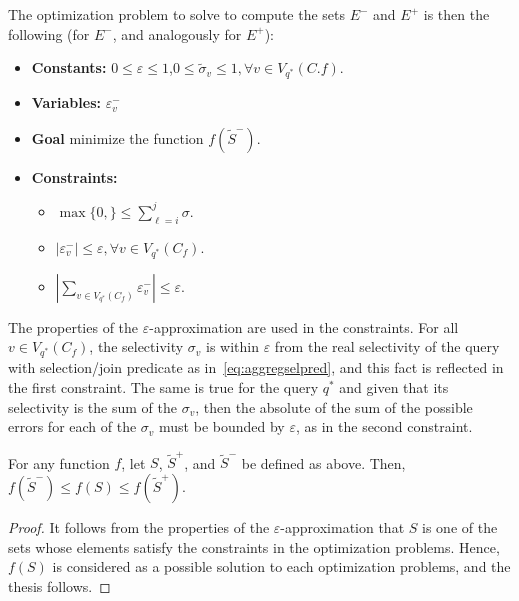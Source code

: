 The optimization problem to solve to compute the sets $E^-$ and $E^+$ is then
the following (for $E^-$, and analogously for $E^+$):
\begin{itemize}
  \item{\bf Constants:} $0\le\varepsilon\le 1$,$0\le \tilde\sigma_v\le 1, \forall v\in
    V_{q^*}(C.f)$.
  \item{\bf Variables:} $\varepsilon^-_v$ 
  \item{\bf Goal} minimize the function $f(\tilde{S}^-)$.
  \item{\bf Constraints:} 
    \begin{itemize}
      \item $\max\{0, \} \le \sum_{\ell=i}^j \sigma $.
      \item $|\varepsilon^-_v|\le\varepsilon,\forall v\in V_{q^*}(C_f)$.
      \item $\left|\displaystyle\sum_{v\in V_{q^*}(C_f)}\varepsilon^-_v\right|\le\varepsilon$.

    \end{itemize}
\end{itemize}
The properties of the $\varepsilon$-approximation are used in the constraints.
For all $v\in V_{q^*}(C_f)$, the selectivity $\sigma_v$ is within $\varepsilon$ from the
real selectivity of the query with selection/join predicate as
in~\eqref{eq:aggregselpred}, and this fact is reflected in the first constraint.
The same is true for the query $q^*$ and given that its selectivity is the sum
of the $\sigma_v$, then the absolute of the sum of the possible errors for each
of the $\sigma_v$ must be bounded by $\varepsilon$, as in the second constraint.

\begin{lemma}\label{lem:confbounds}
  For any function $f$, let $S$, $\tilde{S}^+$, and $\tilde{S}^-$ be defined as
  above. Then, $f(\tilde{S}^-)\le f(S)\le f(\tilde{S}^+)$.
\end{lemma}
\begin{proof}
  It follows from the properties of the $\varepsilon$-approximation that $S$ is
  one of the sets whose elements satisfy the constraints in the optimization
  problems. Hence, $f(S)$ is considered as a possible solution to each
  optimization problems, and the thesis follows.
\end{proof}

